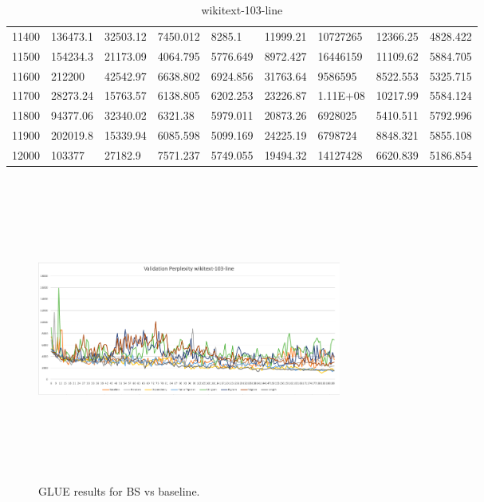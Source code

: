 \begin{table}[]
{\begin{tabular}{|l|l|l|l|l|l|l|l|l|}
11400 & 136473.1 & 32503.12 & 7450.012 & 8285.1 & 11999.21 & 10727265 & 12366.25 & 4828.422 \\
11500 & 154234.3 & 21173.09 & 4064.795 & 5776.649 & 8972.427 & 16446159 & 11109.62 & 5884.705 \\
11600 & 212200 & 42542.97 & 6638.802 & 6924.856 & 31763.64 & 9586595 & 8522.553 & 5325.715 \\
11700 & 28273.24 & 15763.57 & 6138.805 & 6202.253 & 23226.87 & 1.11E+08 & 10217.99 & 5584.124 \\
11800 & 94377.06 & 32340.02 & 6321.38 & 5979.011 & 20873.26 & 6928025 & 5410.511 & 5792.996 \\
11900 & 202019.8 & 15339.94 & 6085.598 & 5099.169 & 24225.19 & 6798724 & 8848.321 & 5855.108 \\
12000 & 103377 & 27182.9 & 7571.237 & 5749.055 & 19494.32 & 14127428 & 6620.839 & 5186.854 \\
\end{tabular}
}
\caption{wikitext-103-line}
\label{tab:wikitext-103-line}
\end{table}
\begin{figure}[h]
\centering
\includegraphics[width=10cm, height=10cm]{Thesis/images/wiki103-line-valid.png}
\caption{GLUE results for BS vs baseline.}
\end{figure}
